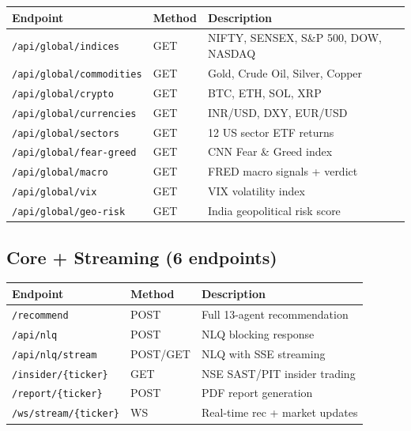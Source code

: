 \documentclass[11pt, a4paper]{article}
\begin{document}
\begin{center}
\scriptsize
\begin{tabular}{L{5.2cm} C{1.2cm} L{6.8cm}}
  \toprule
  \textbf{Endpoint} & \textbf{Method} & \textbf{Description} \\
  \midrule
  \texttt{/api/global/indices}    & GET & NIFTY, SENSEX, S\&P 500, DOW, NASDAQ \\
  \texttt{/api/global/commodities}& GET & Gold, Crude Oil, Silver, Copper \\
  \texttt{/api/global/crypto}     & GET & BTC, ETH, SOL, XRP \\
  \texttt{/api/global/currencies} & GET & INR/USD, DXY, EUR/USD \\
  \texttt{/api/global/sectors}    & GET & 12 US sector ETF returns \\
  \texttt{/api/global/fear-greed} & GET & CNN Fear \& Greed index \\
  \texttt{/api/global/macro}      & GET & FRED macro signals + verdict \\
  \texttt{/api/global/vix}        & GET & VIX volatility index \\
  \texttt{/api/global/geo-risk}   & GET & India geopolitical risk score \\
  \bottomrule
\end{tabular}
\end{center}

\subsection{Core + Streaming (6 endpoints)}

\begin{center}
\scriptsize
\begin{tabular}{L{5.2cm} C{1.2cm} L{6.8cm}}
  \toprule
  \textbf{Endpoint} & \textbf{Method} & \textbf{Description} \\
  \midrule
  \texttt{/recommend}             & POST     & Full 13-agent recommendation \\
  \texttt{/api/nlq}               & POST     & NLQ blocking response \\
  \texttt{/api/nlq/stream}        & POST/GET & NLQ with SSE streaming \\
  \texttt{/insider/\{ticker\}}    & GET      & NSE SAST/PIT insider trading \\
  \texttt{/report/\{ticker\}}     & POST     & PDF report generation \\
  \texttt{/ws/stream/\{ticker\}}  & WS       & Real-time rec + market updates \\
  \bottomrule
\end{tabular}
\end{center}
\end{document}
